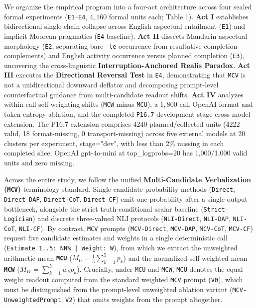 \documentclass[11pt,a4paper]{article}
\begin{document}
We organize the empirical program into a four-act architecture across four sealed formal experiments (\texttt{E1}--\texttt{E4}, $4{,}160$ formal units each; Table 1). \textbf{Act I} establishes bidirectional single-chain collapse across English aspectual entailment (\texttt{E1}) and implicit Moorean pragmatics (\texttt{E4} baseline). \textbf{Act II} dissects Mandarin aspectual morphology (\texttt{E2}, separating bare \texttt{-\allowbreak{}le} occurrence from resultative completion complements) and English activity occurrence versus planned completion (\texttt{E3}), uncovering the cross-linguistic \textbf{Interruption-Anchored Realis Paradox}. \textbf{Act III} executes the \textbf{Directional Reversal Test} in \texttt{E4}, demonstrating that \texttt{MCV} is not a unidirectional downward deflator and decomposing prompt-level counterfactual guidance from multi-candidate readout shifts. \textbf{Act IV} analyzes within-call self-weighting shifts (\texttt{MCW} minus \texttt{MCU}), a $1{,}800$-call OpenAI format and token-entropy ablation, and the completed \texttt{P16.7} development-stage cross-model extension. The P16.7 extension comprises 4240 planned/collected units (4222 valid, 18 format-missing, 0 transport-missing) across five external models at 20 clusters per experiment, stage="dev", with less than 2\% missing in each completed slice; OpenAI gpt-4o-mini at top\_\allowbreak{}logprobs=20 has 1,000/1,000 valid units and zero missing.

Across the entire study, we follow the unified \textbf{Multi-Candidate Verbalization (\texttt{MCV})} terminology standard. Single-candidate probability methods (\texttt{Direct}, \texttt{Direct-\allowbreak{}DAP}, \texttt{Direct-\allowbreak{}CoT}, \texttt{Direct-\allowbreak{}CF}) emit one probability after a single-output bottleneck, alongside the strict truth-conditional scalar baseline (\texttt{Strict-\allowbreak{}Logician}) and discrete three-valued NLI protocols (\texttt{NLI-\allowbreak{}Direct}, \texttt{NLI-\allowbreak{}DAP}, \texttt{NLI-\allowbreak{}CoT}, \texttt{NLI-\allowbreak{}CF}). By contrast, \texttt{MCV} prompts (\texttt{MCV-\allowbreak{}Direct}, \texttt{MCV-\allowbreak{}DAP}, \texttt{MCV-\allowbreak{}CoT}, \texttt{MCV-\allowbreak{}CF}) request five candidate estimates and weights in a single deterministic call (\texttt{Estimate 1..5: NN\% | Weight: W}), from which we extract the unweighted arithmetic mean \textbf{\texttt{MCU}} ($M_U = \frac{1}{5}\sum_{k=1}^5 p_k$) and the normalized self-weighted mean \textbf{\texttt{MCW}} ($M_W = \sum_{k=1}^5 \tilde{w}_k p_k$). Crucially, under \texttt{MCU} and \texttt{MCW}, \texttt{MCU} denotes the equal-weight readout computed from the standard weighted \texttt{MCV} prompt (\texttt{V0}), which must be distinguished from the prompt-level unweighted ablation variant (\texttt{MCV-\allowbreak{}UnweightedPrompt}, \texttt{V2}) that omits weights from the prompt altogether.
\end{document}
